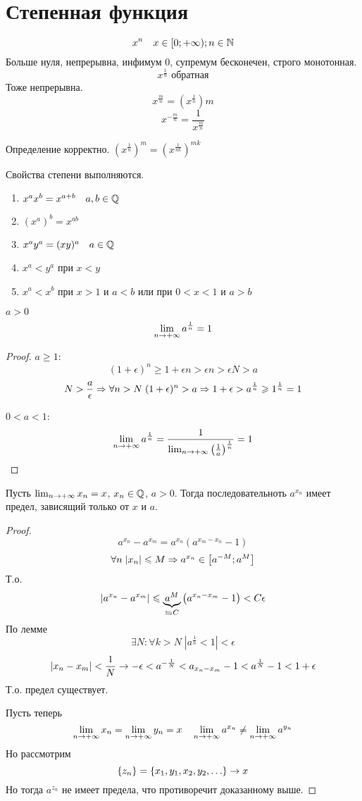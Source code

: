 \section{Степенная функция}
$$x^n \quad x \in [0;+\infty); n \in \mathbb{N}$$
Больше нуля, непрерывна, инфимум 0, супремум бесконечен, строго монотонная.
$$x^\frac1n\text{ обратная}$$
Тоже непрерывна.
$$x^{\frac{m}n} = \left(x^\frac1n\right)m$$
$$x^{-\frac{m}n}=\frac1{x^{\frac{m}n}}$$

\begin{assertion}
Определение корректно.  $(x^{\frac1n})^m = (x^{\frac{1}{nk}})^{mk}$
\end{assertion}
\begin{assertion}
Свойства степени выполняются.
\begin{enumerate}
\item $x^a x^b = x^{a+b} \quad a, b \in \mathbb{Q}$
\item $(x^a)^b = x^{ab}$
\item $x^a y^a = (xy)^a \quad a \in \mathbb{Q}$
\item $x^a < y^a$ при $x < y$
\item $x^a < x^b$ при $x > 1$ и $a < b$ или при $0 < x < 1$ и $a > b $
\end{enumerate}
\end{assertion}

\begin{lemma}
$a>0$
$$\lim_{n\rightarrow+\infty} a^{\frac1n} = 1$$
\end{lemma}
\begin{proof}
$a \geqslant 1$:
$$(1+\epsilon)^n \geqslant 1 + \epsilon n > \epsilon n > \epsilon N > a$$
$$N > \frac{a}\epsilon \Rightarrow \forall n > N\; (1+\epsilon)^n > a \Rightarrow 1 + \epsilon > a^{\frac1n} \geqslant 1^{\frac1n} = 1$$

$0 < a < 1$:
$$\lim_{n\rightarrow+\infty} a^{\frac1n} = \frac1{\lim_{n\rightarrow+\infty} \left(\frac1a\right)^{\frac1n}} = 1$$
\end{proof}

\begin{theorem}{}
Пусть $\lim_{n\rightarrow+\infty} x_n = x$, $x_n \in \mathbb{Q}$, $a > 0$. Тогда последовательноть $a^{x_n}$ имеет предел, зависящий только от $x$ и $a$.
\end{theorem}
\begin{proof}
$$a^{x_n} - a^{x_m} = a^{x_n}\left(a^{x_m-x_n} - 1\right)$$
$$\forall n\; |x_n| \leqslant M \Rightarrow a^{x_n} \in \left[a^{-M}; a^M\right]$$
Т.о.
$$\left|a^{x_n} - a^{x_m}\right| \leqslant \underbrace{a^M}_{\leftrightharpoons C} \left(a^{x_n-x_m} - 1\right) < C\epsilon$$
По лемме 
$$\exists N\colon \forall k > N\; |a^{\frac1n} < 1| < \epsilon$$
$$|x_n - x_m| < \frac1N \rightarrow -\epsilon < a^{-\frac1N} < a_{x_n-x_m} - 1 < a^{\frac1N} - 1 < 1 + \epsilon$$
Т.о. предел существует.

Пусть теперь 
$$\lim_{n\rightarrow+\infty} x_n = \lim_{n\rightarrow+\infty} y_n = x \quad \lim_{n\rightarrow+\infty} a^{x_n} \ne \lim_{n\rightarrow+\infty} a^{y_n}$$
Но рассмотрим
$$\left\{z_n\right\} = \left\{x_1, y_1, x_2, y_2, \ldots\right\} \rightarrow x$$
Но тогда $a^{z_n}$ не имеет предела, что противоречит доказанному выше.
\end{proof}

